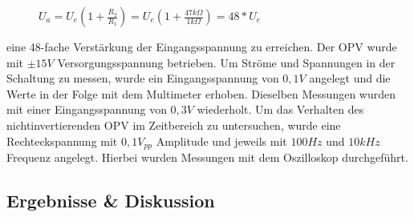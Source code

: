 \documentclass[12pt,a4paper,titlepage]{article}
\begin{document}
\begin{figure}[H]
  \centering
  $U_a = U_e(1+\frac{R_2}{R_1}) = U_e(1+\frac{47k\Omega}{1k\Omega}) = 48*U_e$
\end{figure}

\noindent eine 48-fache Verstärkung der Eingangsspannung zu erreichen. Der OPV wurde mit $\pm 15V$ Versorgungsspannung betrieben. Um Ströme und Spannungen in der Schaltung zu messen, wurde ein Eingangsspannung von $0,1V$ angelegt und die Werte in der Folge mit dem Multimeter erhoben. Dieselben Messungen wurden mit einer Eingangsspannung von $0,3V$ wiederholt. Um das Verhalten des nichtinvertierenden OPV im Zeitbereich zu untersuchen, wurde eine Rechteckspannung mit $0,1V_{pp}$ Amplitude und jeweils mit $100Hz$ und $10kHz$ Frequenz angelegt. Hierbei wurden Messungen mit dem Oszilloskop durchgeführt.

\subsection*{Ergebnisse \& Diskussion}

\end{document}

